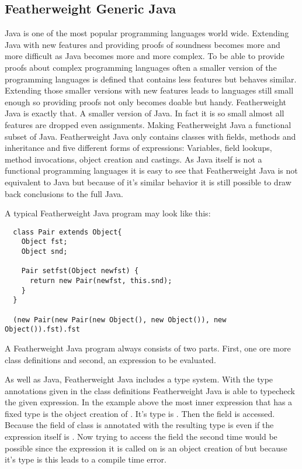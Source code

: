 \subsection{Featherweight Generic Java}
Java is one of the most popular programming languages world wide. Extending Java with new features and providing proofs of soundness becomes more and more difficult as Java becomes more and more complex.
To be able to provide proofs about complex programming languages often a smaller version of the programming languages is defined that contains less features but behaves similar.
Extending those smaller versions with new features leads to languages still small enough so providing proofs not only becomes doable but handy.
Featherweight Java is exactly that. A smaller version of Java. In fact it is so small almost all features are dropped even assignments. Making Featherweight Java a functional subset of Java.
Featherweight Java only contains classes with fields, methods and inheritance and five different forms of expressions: Variables, field lookups, method invocations, object creation and castings.
As Java itself is not a functional programming languages it is easy to see that Featherweight Java is not equivalent to Java but because of it's similar behavior it is still possible to draw back conclusions to the full Java.

A typical Featherweight Java program may look like this:

\begin{verbatim}
  class Pair extends Object{
    Object fst;
    Object snd;

    Pair setfst(Object newfst) {
      return new Pair(newfst, this.snd);
    }
  }

  (new Pair(new Pair(new Object(), new Object()), new Object()).fst).fst
\end{verbatim}

A Featherweight Java program always consists of two parts. First, one ore more class definitions and second, an expression to be evaluated.

As well as Java, Featherweight Java includes a type system. With the type annotations given in the class definitions Featherweight Java is able to typecheck the given expression.
In the example above the most inner expression that has a fixed type is the object creation of . It's type is .
Then the field  is accessed. Because the field  of class  is annotated with  the resulting type is  even if the expression itself is .
Now trying to access the field  the second time would be possible since the expression it is called on is an object creation of  but because it's type is  this leads to a compile time error.

